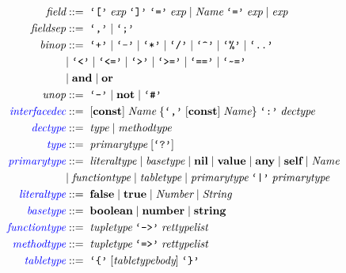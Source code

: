 \begin{align*}
\textit{field} & ::= \; \texttt{`['} \; \textit{exp} \; \texttt{`]'} \; \texttt{`='} \; \textit{exp} \; | \;
  \textit{Name} \; \texttt{`='} \; \textit{exp} \; | \;
  \textit{exp}\\
\textit{fieldsep} & ::= \; \texttt{`,'} \; | \; \texttt{`;'}\\
\textit{binop} & ::= \; \texttt{`+'} \; | \; \texttt{`-'} \; | \; \texttt{`*'} \; | \; \texttt{`/'} \; | \;
  \texttt{`\textasciicircum'} \; | \; \texttt{`\%'} \; | \; \texttt{`..'}\\
& | \; \texttt{`<'} \; | \; \texttt{`<='} \; | \; \texttt{`>'} \; | \; \texttt{`>='} \; | \;
  \texttt{`=='} \; | \; \texttt{`\textasciitilde='}\\
& | \; \textbf{and} \; | \; \textbf{or}\\
\textit{unop} & ::= \; \texttt{`-'} \; | \; \textbf{not} \; | \; \texttt{`\#'}\\
\textcolor{blue}{\textit{interfacedec}} & ::= \; [\textbf{const}] \; \textit{Name} \;
  \{\texttt{`,'} \; [\textbf{const}] \; \textit{Name}\} \; \texttt{`:'} \; \textit{dectype}\\
\textcolor{blue}{\textit{dectype}} & ::= \; \textit{type} \; | \; \textit{methodtype}\\
\textcolor{blue}{\textit{type}} & ::= \; \textit{primarytype} \; [\texttt{`?'}]\\
\textcolor{blue}{\textit{primarytype}} & ::= \; \textit{literaltype} \; | \;
  \textit{basetype} \; | \;
  \textbf{nil} \; | \;
  \textbf{value} \; | \;
  \textbf{any} \; | \;
  \textbf{self} \; | \;
  \textit{Name}\\
& | \; \textit{functiontype} \; | \;
  \textit{tabletype} \; | \;
  \textit{primarytype} \; \texttt{`|'} \; \textit{primarytype}\\
\textcolor{blue}{\textit{literaltype}} & ::= \; \textbf{false} \; | \;
  \textbf{true} \; | \;
  \textit{Number} \; | \;
  \textit{String}\\
\textcolor{blue}{\textit{basetype}} & ::= \; \textbf{boolean} \; | \;
  \textbf{number} \; | \;
  \textbf{string}\\
\textcolor{blue}{\textit{functiontype}} & ::= \; \textit{tupletype} \; \texttt{`->'} \; \textit{rettypelist}\\
\textcolor{blue}{\textit{methodtype}} & ::= \; \textit{tupletype} \; \texttt{`=>'} \; \textit{rettypelist}\\
\textcolor{blue}{\textit{tabletype}} & ::= \; \texttt{`\{'} \; [\textit{tabletypebody}] \; \texttt{`\}'}\\

\end{align*}
